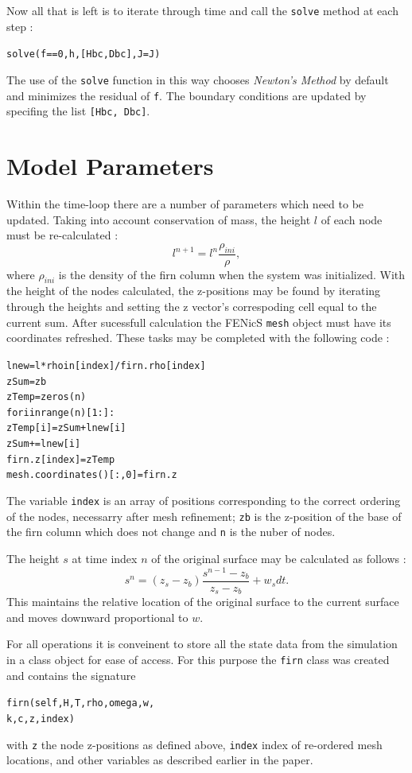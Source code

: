 \documentclass{article}%
\begin{document}
Now all that is left is to iterate through time and call the \texttt{solve} method at each step :
\small
\begin{alltt}
solve(f == 0, h, [Hbc, Dbc], J=J)
\end{alltt}
\normalsize
The use of the \texttt{solve} function in this way chooses \emph{Newton's Method} by default and minimizes the residual of \texttt{f}.  The boundary conditions are updated by specifing the list \texttt{[Hbc, Dbc]}.


\section{Model Parameters}

Within the time-loop there are a number of parameters which need to be updated.  Taking into account conservation of mass, the height $l$ of each node must be re-calculated :
  $$l^{n+1} = l^n \frac{\rho_{ini}}{\rho},$$
where $\rho_{ini}$ is the density of the firn column when the system was initialized.  With the height of the nodes calculated, the z-positions may be found by iterating through the heights and setting the z vector's correspoding cell equal to the current sum.  After sucessfull calculation the FENicS \texttt{mesh} object must have its coordinates refreshed.  These tasks may be completed with the following code :
\small
\begin{alltt}
lnew     = l*rhoin[index] / firn.rho[index]
zSum     = zb
zTemp    = zeros(n)
for i in range(n)[1:]:
  zTemp[i] = zSum + lnew[i]
  zSum    += lnew[i]
firn.z[index] = zTemp
mesh.coordinates()[:,0] = firn.z
\end{alltt}
\normalsize
The variable \texttt{index} is an array of positions corresponding to the correct ordering of the nodes, necessarry after mesh refinement; \texttt{zb} is the z-position of the base of the firn column which does not change and \texttt{n} is the nuber of nodes.

The height $s$ at time index $n$ of the original surface may be calculated as follows :
  $$s^{n} = (z_s - z_b) \frac{s^{n-1} - z_b}{z_{s} - z_b} + w_s dt.$$
This maintains the relative location of the original surface to the current surface and moves downward proportional to $w$.

For all operations it is conveinent to store all the state data from the simulation in a class object for ease of access.  For this purpose the \texttt{firn} class was created and contains the signature 
\small
\begin{alltt}
firn(self, H, T, rho, omega, w, 
     k, c, z, index)
\end{alltt}
\normalsize
with \texttt{z} the node z-positions as defined above, \texttt{index} index of re-ordered mesh locations, and other variables as described earlier in the paper.
\end{document}

